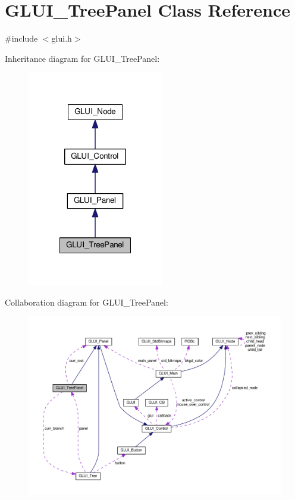 \hypertarget{class_g_l_u_i___tree_panel}{\section{G\+L\+U\+I\+\_\+\+Tree\+Panel Class Reference}
\label{class_g_l_u_i___tree_panel}
}


{\ttfamily \#include $<$glui.\+h$>$}



Inheritance diagram for G\+L\+U\+I\+\_\+\+Tree\+Panel\+:\nopagebreak
\begin{figure}[H]
\begin{center}
\leavevmode
\includegraphics[width=168pt]{class_g_l_u_i___tree_panel__inherit__graph}
\end{center}
\end{figure}


Collaboration diagram for G\+L\+U\+I\+\_\+\+Tree\+Panel\+:\nopagebreak
\begin{figure}[H]
\begin{center}
\leavevmode
\includegraphics[width=350pt]{class_g_l_u_i___tree_panel__coll__graph}
\end{center}
\end{figure}
